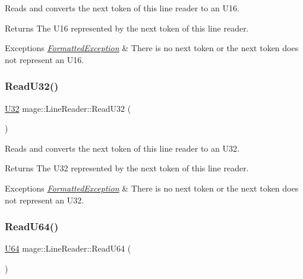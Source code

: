 Reads and converts the next token of this line reader to an {\ttfamily U16}.

\begin{DoxyReturn}{Returns}
The {\ttfamily U16} represented by the next token of this line reader. 
\end{DoxyReturn}

\begin{DoxyExceptions}{Exceptions}
{\em \hyperlink{structmage_1_1_formatted_exception}{Formatted\+Exception}} & There is no next token or the next token does not represent an {\ttfamily U16}. \\
\hline
\end{DoxyExceptions}
\hypertarget{classmage_1_1_line_reader_a16e9bd6846cc8e90182582e67c41af4f}{}\label{classmage_1_1_line_reader_a16e9bd6846cc8e90182582e67c41af4f} 
\subsubsection{\texorpdfstring{Read\+U32()}{ReadU32()}}
{\footnotesize\ttfamily \hyperlink{namespacemage_a41c104c036fba3756a74e19f793eeaa1}{U32} mage\+::\+Line\+Reader\+::\+Read\+U32 (\begin{DoxyParamCaption}{ }\end{DoxyParamCaption})\hspace{0.3cm}{\ttfamily [protected]}}

Reads and converts the next token of this line reader to an {\ttfamily U32}.

\begin{DoxyReturn}{Returns}
The {\ttfamily U32} represented by the next token of this line reader. 
\end{DoxyReturn}

\begin{DoxyExceptions}{Exceptions}
{\em \hyperlink{structmage_1_1_formatted_exception}{Formatted\+Exception}} & There is no next token or the next token does not represent an {\ttfamily U32}. \\
\hline
\end{DoxyExceptions}
\hypertarget{classmage_1_1_line_reader_aa8866c69c282910527a2453ac80bf00f}{}\label{classmage_1_1_line_reader_aa8866c69c282910527a2453ac80bf00f} 
\subsubsection{\texorpdfstring{Read\+U64()}{ReadU64()}}
{\footnotesize\ttfamily \hyperlink{namespacemage_a6672cf3c861707ce4a3235a3eb43941d}{U64} mage\+::\+Line\+Reader\+::\+Read\+U64 (\begin{DoxyParamCaption}{ }\end{DoxyParamCaption})\hspace{0.3cm}{\ttfamily [protected]}}

